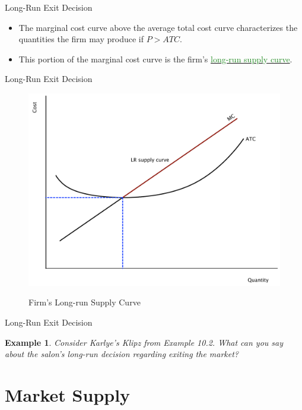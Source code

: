 \documentclass[xcolor={dvipsnames},pdf, hyperref={colorlinks=true, citecolor=ForestGreen, linkcolor=BlueViolet, urlcolor=Magenta}, handout]{beamer}
\newtheorem{exmp}{Example}[section]
\newcommand{\ddp}[1]{{\textcolor{ForestGreen}{#1}}}
\newcommand{\dd}[1]{{\underline{\textcolor{ForestGreen}{#1}}}}
\begin{document}
\begin{frame}{Long-Run Exit Decision}
\begin{itemize}
	\item The marginal cost curve above the average total cost curve characterizes the quantities the firm may produce if $P > ATC$. 
	\item This portion of the marginal cost curve is the firm's \dd{long-run supply curve}.

\end{itemize}
\end{frame}


\begin{frame}[b]{Long-Run Exit Decision}

		\begin{figure}[H]
			\centering
			\ddp{	\includegraphics[scale=.3]{plot65.pdf}}
			\caption{Firm's Long-run Supply Curve}
		\end{figure}
		
		
\end{frame}

\begin{frame}{Long-Run Exit Decision}
	\begin{exmp}
	Consider Karlye's Klipz from Example 10.2. What can you say about the salon's long-run decision regarding exiting the market? 
\end{exmp}
\pause \ddp{$ATC = 7,000/175 = \$40 > P$, so exit in long run.}
\end{frame}

\section{Market Supply}
\end{document}
